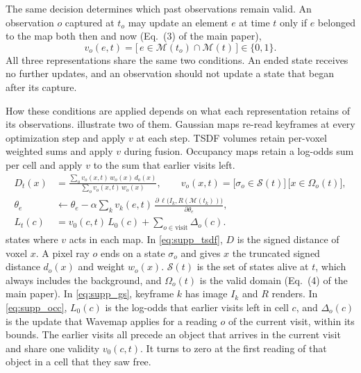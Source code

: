 \documentclass[10pt,onecolumn,letterpaper]{article}
\begin{document}
The same decision determines which past observations remain valid. An observation $o$ captured at $t_o$ may update an
element $e$ at time $t$ only if $e$ belonged to the map both then and now (Eq.~(3) of the main paper),
\begin{equation}
  v_o(e,t)=\bigl[\,e\in\mathcal{M}(t_o)\cap\mathcal{M}(t)\,\bigr]\in\{0,1\}.
  \label{eq:supp_valid}
\end{equation}
All three representations share the same two conditions. An ended state receives no further updates, and an
observation should not update a state that began after its capture.

How these conditions are applied depends on what each representation retains of its observations.  illustrate two of them. Gaussian maps re-read keyframes at every optimization step and apply
$v$ at each step. TSDF volumes retain per-voxel weighted sums and apply $v$ during fusion.
Occupancy maps retain a log-odds sum per cell and apply $v$ to the sum that earlier visits left.
\begin{align}
  D_t(x)&=\frac{\sum_o v_o(x,t)\,w_o(x)\,d_o(x)}{\sum_o v_o(x,t)\,w_o(x)},
  \qquad v_o(x,t)=\bigl[\sigma_o\in\mathcal{S}(t)\bigr]\,\bigl[x\in\Omega_o(t)\bigr],\label{eq:supp_tsdf}\\
  \theta_e&\leftarrow\theta_e-\alpha\sum_k v_k(e,t)\,\frac{\partial\,\ell\bigl(I_k,R(\mathcal{M}(t_k))\bigr)}{\partial\theta_e},\label{eq:supp_gs}\\
  L_t(c)&=v_0(c,t)\,L_0(c)+\sum_{o\in\mathrm{visit}}\Delta_o(c).\label{eq:supp_occ}
\end{align}
 states where $v$ acts in each map. In \cref{eq:supp_tsdf}, $D$ is the signed distance of voxel
$x$. A pixel ray $o$ ends on a state $\sigma_o$ and gives $x$ the truncated signed distance $d_o(x)$ and weight $w_o(x)$. $\mathcal{S}(t)$ is the set of states alive at $t$, which always includes the background,
and $\Omega_o(t)$ is the valid domain (Eq.~(4) of the main paper). In \cref{eq:supp_gs}, keyframe $k$ has image
$I_k$ and $R$ renders. In \cref{eq:supp_occ}, $L_0(c)$ is the log-odds that earlier visits left in cell $c$, and $\Delta_o(c)$ is the update that Wavemap applies for a reading $o$ of the current visit, within its bounds. The earlier visits all precede an object that arrives in the current visit and share one validity $v_0(c,t)$. It turns to zero at the first reading of that object in a cell that they saw free.
\end{document}
